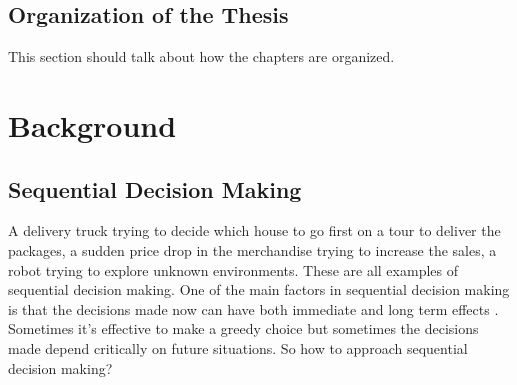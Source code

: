 \documentclass[12pt]{report}
\begin{document}

\section{Organization of the Thesis}

This section should talk about how the chapters are organized.


\chapter{Background} %

\label{background} %


\section{Sequential Decision Making}
A delivery truck trying to decide which house to go first on a tour to deliver the packages, a sudden price drop in the merchandise trying to increase the sales, a robot trying to explore unknown environments. These are all examples of sequential decision making. One of the main factors in sequential decision making is that the decisions made now can have both immediate and long term effects \cite{littman1996algorithms}. Sometimes it's effective to make a greedy choice but sometimes the decisions made depend critically on future situations. So how to approach sequential decision making?
\end{document}
